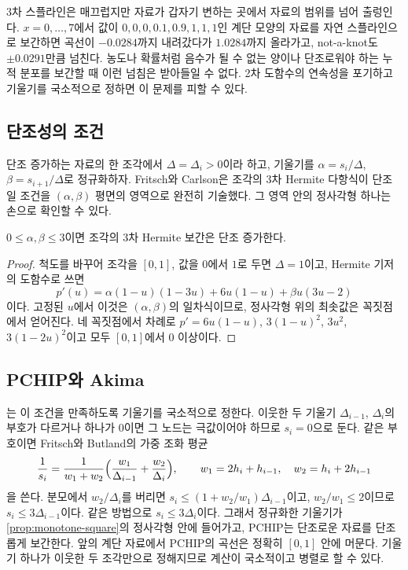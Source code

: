 3차 스플라인은 매끄럽지만 자료가 갑자기 변하는 곳에서 자료의 범위를 넘어 출렁인다. $x=0,\dots,7$에서 값이 $0,0,0,0.1,0.9,1,1,1$인 계단 모양의 자료를 자연 스플라인으로 보간하면 곡선이 $-0.0284$까지 내려갔다가 $1.0284$까지 올라가고, not-a-knot도 $\pm0.0291$만큼 넘친다. 농도나 확률처럼 음수가 될 수 없는 양이나 단조로워야 하는 누적 분포를 보간할 때 이런 넘침은 받아들일 수 없다. 2차 도함수의 연속성을 포기하고 기울기를 국소적으로 정하면 이 문제를 피할 수 있다.

\subsection{단조성의 조건}

단조 증가하는 자료의 한 조각에서 $\Delta=\Delta_i>0$이라 하고, 기울기를 $\alpha=s_i/\Delta$, $\beta=s_{i+1}/\Delta$로 정규화하자. Fritsch와 Carlson은 조각의 3차 Hermite 다항식이 단조일 조건을 $(\alpha,\beta)$ 평면의 영역으로 완전히 기술했다\cite{fritsch1980}. 그 영역 안의 정사각형 하나는 손으로 확인할 수 있다.

\begin{proposition}
\label{prop:monotone-square}
$0\le\alpha,\beta\le3$이면 조각의 3차 Hermite 보간은 단조 증가한다.
\end{proposition}

\begin{proof}
척도를 바꾸어 조각을 $[0,1]$, 값을 $0$에서 $1$로 두면 $\Delta=1$이고, Hermite 기저의 도함수로 쓰면
\[
p'(u)=\alpha(1-u)(1-3u)+6u(1-u)+\beta u(3u-2)
\]
이다. 고정된 $u$에서 이것은 $(\alpha,\beta)$의 일차식이므로, 정사각형 위의 최솟값은 꼭짓점에서 얻어진다. 네 꼭짓점에서 차례로 $p'=6u(1-u)$, $3(1-u)^2$, $3u^2$, $3(1-2u)^2$이고 모두 $[0,1]$에서 $0$ 이상이다.
\end{proof}

\subsection{PCHIP와 Akima}

는 이 조건을 만족하도록 기울기를 국소적으로 정한다. 이웃한 두 기울기 $\Delta_{i-1}$, $\Delta_i$의 부호가 다르거나 하나가 $0$이면 그 노드는 극값이어야 하므로 $s_i=0$으로 둔다. 같은 부호이면 Fritsch와 Butland의 가중 조화 평균
\[
\frac1{s_i}=\frac1{w_1+w_2}\Bigl(\frac{w_1}{\Delta_{i-1}}+\frac{w_2}{\Delta_i}\Bigr),\qquad w_1=2h_i+h_{i-1},\quad w_2=h_i+2h_{i-1}
\]
을 쓴다\cite{fritsch1984}. 분모에서 $w_2/\Delta_i$를 버리면 $s_i\le(1+w_2/w_1)\Delta_{i-1}$이고, $w_2/w_1\le2$이므로 $s_i\le3\Delta_{i-1}$이다. 같은 방법으로 $s_i\le3\Delta_i$이다. 그래서 정규화한 기울기가 \cref{prop:monotone-square}의 정사각형 안에 들어가고, PCHIP는 단조로운 자료를 단조롭게 보간한다. 앞의 계단 자료에서 PCHIP의 곡선은 정확히 $[0,1]$ 안에 머문다. 기울기 하나가 이웃한 두 조각만으로 정해지므로 계산이 국소적이고 병렬로 할 수 있다.

